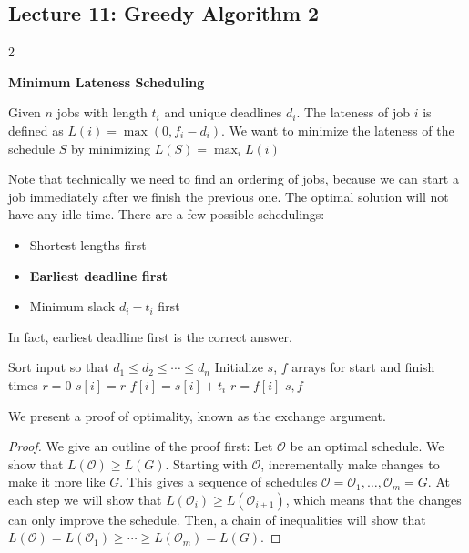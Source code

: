 \subsection{Lecture 11: Greedy Algorithm 2}
\begin{multicols}{2}
\begin{leftbar}
    \textbf{Minimum Lateness Scheduling}

    Given $n$ jobs with length $t_i$ and unique deadlines $d_i$. The lateness of job $i$ is defined as $L(i) = \max(0, f_i - d_i)$. We want to minimize the lateness of the schedule $S$ by minimizing $L(S) = \max_iL(i)$
\end{leftbar}
Note that technically we need to find an ordering of jobs, because we can start a job immediately after we finish the previous one. The optimal solution will not have any idle time. There are a few possible schedulings: 
\begin{itemize}
    \item Shortest lengths first
    \item \textbf{Earliest deadline first}
    \item Minimum slack $d_i - t_i$ first
\end{itemize}
In fact, earliest deadline first is the correct answer. 
\bigskip
\begin{algorithm}[H]
\caption{Minimum Lateness Scheduling}
    \begin{algorithmic}[1]
        \State Sort input so that $d_1\leq d_2 \leq \cdots \leq d_n$ 
        \State Initialize $s$, $f$ arrays for start and finish times
        \State $r = 0$
            \State $s[i] = r$
            \State $f[i] = s[i] + t_i$
            \State $r = f[i]$
        \EndFor
        \State\Return $s, f$
    \end{algorithmic}
\end{algorithm}

We present a proof of optimality, known as the exchange argument. 
\begin{proof}
    We give an outline of the proof first: Let $\mathcal{O}$ be an optimal schedule. We show that $L(\mathcal{O}) \geq L(G)$. Starting with $\mathcal{O}$, incrementally make changes to make it more like $G$. This gives a sequence of schedules $\mathcal{O} = \mathcal{O}_1, \ldots, \mathcal{O}_m = G$. At each step we will show that $L(\mathcal{O}_i) \geq L(\mathcal{O}_{i+1})$, which means that the changes can only improve the schedule. Then, a chain of inequalities will show that $L(\mathcal{O}) = L(\mathcal{O}_1) \geq \cdots\geq L(\mathcal{O}_m) = L(G)$. 


\end{proof}
\end{multicols}
